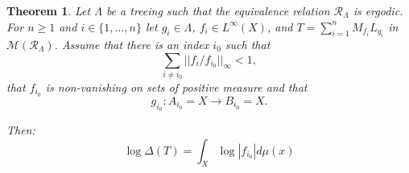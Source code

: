 \documentclass[12pt]{amsart}
\newtheorem{teo}{Theorem}[section]
\numberwithin{equation}{section}
\begin{document}
\begin{teo}\label{r1} Let  $\Lambda$ be a treeing such that the equivalence relation $\mathcal{R}_{\Lambda}$  is ergodic. For $n\geq 1$ and $i\in\{1,\dots, n\}$  let $g_i\in\Lambda$, $f_i\in L^{\infty}(X)$, and $T=\sum_{i=1}^n M_{f_i}L_{g_i}$ in $\mathcal{M}(\mathcal{R}_{\Lambda})$.  Assume that there is an index $i_0$ such that
\begin{equation}\label{ine}
\sum_{i \neq i_0} || f_i/f_{i_0}||_{\infty}<1, 
\end{equation}
that $f_{i_0}$ is non-vanishing on sets of positive measure and that
\begin{equation}\label{nasty}
g_{i_0}: A_{i_0}=X \to B_{i_0}=X.
\end{equation}

Then:
\begin{equation}\label{detr1}
\log \Delta(T) = \int_X \log |f_{i_0}| d\mu(x)
\end{equation}
\end{teo}
\end{document}
